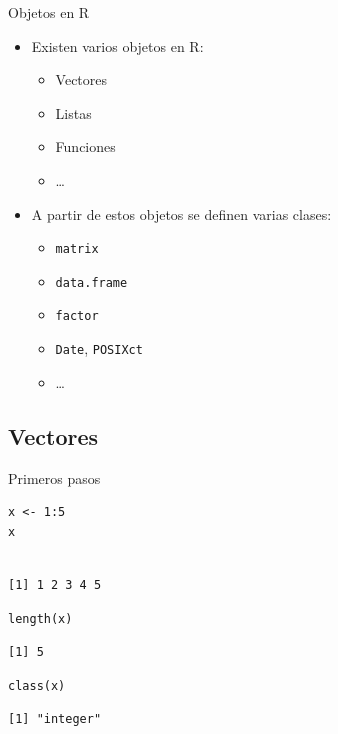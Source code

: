\documentclass[aspectratio=169, usenames,svgnames,dvipsnames]{beamer}
\begin{document}
\begin{frame}[label={sec:org46c964b},fragile]{Objetos en R}
 \begin{itemize}
\item Existen varios objetos en R:
\begin{itemize}
\item Vectores
\item Listas
\item Funciones
\item \ldots{}
\end{itemize}
\item A partir de estos objetos se definen varias clases:
\begin{itemize}
\item \texttt{matrix}
\item \texttt{data.frame}
\item \texttt{factor}
\item \texttt{Date}, \texttt{POSIXct}
\item \ldots{}
\end{itemize}
\end{itemize}
\end{frame}

\subsection{Vectores}
\label{sec:orgeec0f9c}

\begin{frame}[label={sec:org7a3068d},fragile]{Primeros pasos}
 \lstset{language=r,label= ,caption= ,captionpos=b,numbers=none}
\begin{lstlisting}
x <- 1:5
x
\end{lstlisting}

\begin{verbatim}

[1] 1 2 3 4 5
\end{verbatim}


\lstset{language=r,label= ,caption= ,captionpos=b,numbers=none}
\begin{lstlisting}
length(x)
\end{lstlisting}

\begin{verbatim}
[1] 5
\end{verbatim}


\lstset{language=r,label= ,caption= ,captionpos=b,numbers=none}
\begin{lstlisting}
class(x)
\end{lstlisting}

\begin{verbatim}
[1] "integer"
\end{verbatim}
\end{frame}
\end{document}
